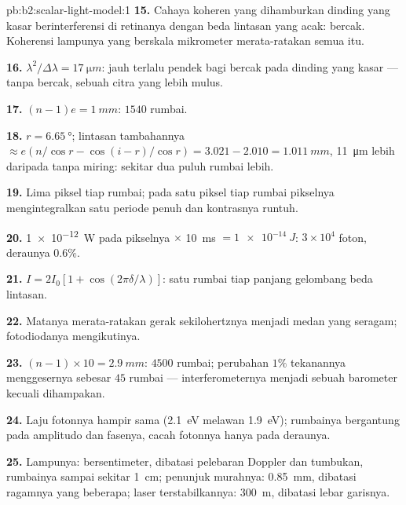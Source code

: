 \begin{solution}{pb:b2:scalar-light-model:1}
\textbf{15.} Cahaya koheren yang dihamburkan dinding yang kasar berinterferensi di
retinanya dengan beda lintasan yang acak: bercak. Koherensi lampunya
yang berskala mikrometer merata-ratakan semua itu.

\textbf{16.} $\lambda^2/\Delta\lambda = \qty{17}{\micro m}$: jauh terlalu pendek bagi bercak pada
dinding yang kasar --- tanpa bercak, sebuah citra yang lebih mulus.

\textbf{17.} $(n - 1)e = \qty{1}{mm}$: $1540$ rumbai.

\textbf{18.} $r = \qty{6.65}{\degree}$; lintasan tambahannya $\approx e(n/\cos r - \cos(i - r)/\cos r)
= 3.021 - 2.010 = \qty{1.011}{mm}$, \qty{11}{\micro m} lebih daripada tanpa miring: sekitar
dua puluh rumbai lebih.

\textbf{19.} Lima piksel tiap rumbai; pada satu piksel tiap rumbai pikselnya
mengintegralkan satu periode penuh dan kontrasnya runtuh.

\textbf{20.} \qty{1e-12}{W} pada pikselnya $\times$ \qty{10}{ms} $= \qty{1e-14}{J}$: $3 \times 10^4$
foton, deraunya $0.6\%$.

\textbf{21.} $I = 2I_0[1 + \cos(2\pi\delta/\lambda)]$: satu rumbai tiap panjang gelombang
beda lintasan.

\textbf{22.} Matanya merata-ratakan gerak sekilohertznya menjadi medan yang
seragam; fotodiodanya mengikutinya.

\textbf{23.} $(n - 1) \times 10 = \qty{2.9}{mm}$: $4500$ rumbai; perubahan $1\%$
tekanannya menggesernya sebesar $45$ rumbai --- interferometernya menjadi sebuah
barometer kecuali dihampakan.

\textbf{24.} Laju fotonnya hampir sama (\qty{2.1}{eV} melawan \qty{1.9}{eV});
rumbainya bergantung pada amplitudo dan fasenya, cacah fotonnya hanya pada
deraunya.

\textbf{25.} Lampunya: bersentimeter, dibatasi pelebaran Doppler dan
tumbukan, rumbainya sampai sekitar \qty{1}{cm}; penunjuk murahnya: \qty{0.85}{mm},
dibatasi ragamnya yang beberapa; laser terstabilkannya: \qty{300}{m}, dibatasi
lebar garisnya.
\end{solution}
